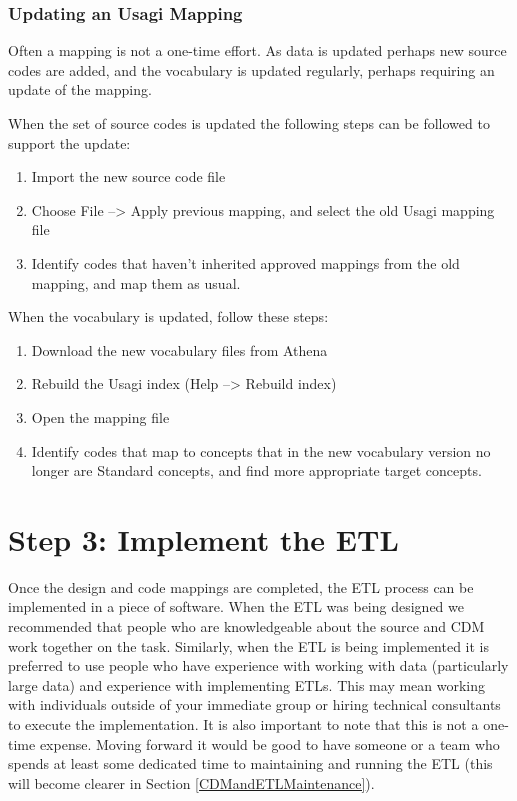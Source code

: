 \documentclass[11pt]{book}
\providecommand{\tightlist}{%
  \setlength{\itemsep}{0pt}\setlength{\parskip}{0pt}}
\theoremstyle{definition}
\theoremstyle{definition}
\theoremstyle{definition}
\theoremstyle{remark}
\begin{document}
\subsubsection*{Updating an Usagi
Mapping}\label{updating-an-usagi-mapping}

Often a mapping is not a one-time effort. As data is updated perhaps new
source codes are added, and the vocabulary is updated regularly, perhaps
requiring an update of the mapping.

When the set of source codes is updated the following steps can be
followed to support the update:

\begin{enumerate}
\def\labelenumi{\arabic{enumi}.}
\tightlist
\item
  Import the new source code file
\item
  Choose File --\textgreater{} Apply previous mapping, and select the
  old Usagi mapping file
\item
  Identify codes that haven't inherited approved mappings from the old
  mapping, and map them as usual.
\end{enumerate}

When the vocabulary is updated, follow these steps:

\begin{enumerate}
\def\labelenumi{\arabic{enumi}.}
\tightlist
\item
  Download the new vocabulary files from Athena
\item
  Rebuild the Usagi index (Help --\textgreater{} Rebuild index)
\item
  Open the mapping file
\item
  Identify codes that map to concepts that in the new vocabulary version
  no longer are Standard concepts, and find more appropriate target
  concepts.
\end{enumerate}

\section{Step 3: Implement the ETL}\label{step-3-implement-the-etl}

Once the design and code mappings are completed, the ETL process can be
implemented in a piece of software. When the ETL was being designed we
recommended that people who are knowledgeable about the source and CDM
work together on the task. Similarly, when the ETL is being implemented
it is preferred to use people who have experience with working with data
(particularly large data) and experience with implementing ETLs. This
may mean working with individuals outside of your immediate group or
hiring technical consultants to execute the implementation. It is also
important to note that this is not a one-time expense. Moving forward it
would be good to have someone or a team who spends at least some
dedicated time to maintaining and running the ETL (this will become
clearer in Section \ref{CDMandETLMaintenance}).
\end{document}
